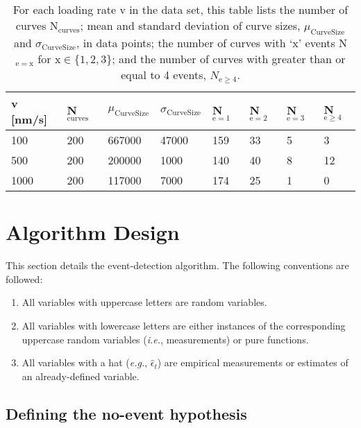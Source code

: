 \begin{table}[htp]
\caption[Data set statistical information]{ For each loading rate v in the data set, this table lists the number of curves N$_{\mathrm{curves}}$; mean and standard deviation of curve sizes, $\mu_{\mathrm{Curve Size}}$ and $\sigma_{\mathrm{Curve Size}}$, in data points; the number of curves with `x' events N$_{\mathrm{e=x}}$ for x$\in\{1,2,3\}$; and the number of curves with greater than or equal to 4 events, $N_{\mathrm{e}\ge4}$. }
\begin{tabularx}{\textwidth}{ l | l | l | l |l |l|l|l }
\hline \hline
v [nm/s] & N$_\mathrm{curves}$ & $\mu_{\mathrm{Curve Size}}$ & $\sigma_{\mathrm{Curve Size}}$ & N$_{\mathrm{e}= 1}$ & N$_{\mathrm{e}= 2}$ & N$_{\mathrm{e}= 3}$ & N$_{\mathrm{e}\ge4}$  \\ \hline
100 & 200 & 667000 & 47000 & 159 & 33 & 5 & 3  \\ \hline
500 & 200 & 200000 & 1000 & 140 & 40 & 8 & 12  \\ \hline
1000 & 200 & 117000 & 7000 & 174 & 25 & 1 & 0  \\ \hline
\end{tabularx}
\end{table}



\chapter{ Algorithm Design}

This section details the event-detection algorithm. The following conventions are followed:

\begin{enumerate}
 \item All variables with uppercase letters are random variables.
 \item All variables with lowercase letters are either instances of the corresponding uppercase random variables (\textit{i.e.}, measurements) or pure functions.
 \item All variables with a hat (\textit{e.g.}, $\hat{\epsilon}_t$) are empirical measurements or estimates of an already-defined variable.
\end{enumerate}

\section{Defining the no-event hypothesis}

